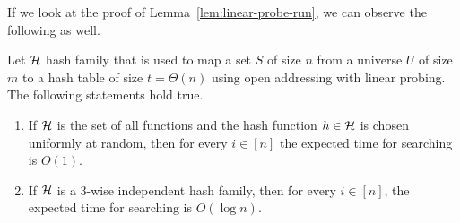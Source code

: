 If we look at the proof of Lemma~\ref{lem:linear-probe-run}, we can observe the
following as well.

\begin{lemma}
  Let ${\cal H}$ hash family that is used to map a set $S$ of size $n$ from a
  universe $U$ of size $m$ to a hash table of size $t = \Theta(n)$ using open
  addressing with linear probing. The following statements hold true.
  \begin{enumerate}
  \item If ${\cal H}$ is the set of all functions and the hash function
    $h\in {\cal H}$ is chosen uniformly at random, then for every $i\in [n]$ the
    expected time for searching is $O(1)$.
  \item If ${\cal H}$ is a $3$-wise independent hash family, then for every
    $i \in [n]$, the expected time for searching is $O(\log n)$.
  \end{enumerate}
\end{lemma}
